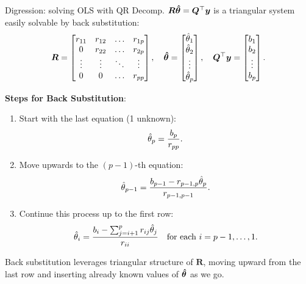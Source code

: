 \documentclass[11pt,compress,t,notes=noshow, xcolor=table]{beamer}
\begin{document}
\begin{vbframe}{Digression: solving OLS with QR Decomp.}
$\bm{R} \bm{\hat{\theta}} = \bm{Q}^{\top} \bm{y}$ is a triangular system easily solvable by back substitution:
\[
\bm{R} = \begin{bmatrix} 
r_{11} & r_{12} & \dots & r_{1p} \\ 
0 & r_{22} & \dots & r_{2p} \\ 
\vdots & \vdots & \ddots & \vdots \\ 
0 & 0 & \dots & r_{pp} 
\end{bmatrix}, \quad 
\bm{\hat{\theta}} = \begin{bmatrix} 
\hat{\theta}_1 \\ 
\hat{\theta}_2 \\ 
\vdots \\ 
\hat{\theta}_p 
\end{bmatrix}, \quad \bm{Q}^{\top} \bm{y} = \begin{bmatrix} 
b_1 \\ 
b_2 \\ 
\vdots \\ 
b_p 
\end{bmatrix}.
\]

\pagebreak

\textbf{Steps for Back Substitution}:
\begin{enumerate}
    \item Start with the last equation (1 unknown):
          \[
          \hat{\theta}_p = \frac{b_p}{r_{pp}}.
          \]
    \item Move upwards to the \( (p-1) \)-th equation:
          \[
          \hat{\theta}_{p-1} = \frac{b_{p-1} - r_{p-1,p} \hat{\theta}_p}{r_{p-1,p-1}}.
          \]
    \item Continue this process up to the first row:
          \[
          \hat{\theta}_i = \frac{b_i - \sum_{j=i+1}^p r_{ij} \hat{\theta}_j}{r_{ii}} \quad \text{for each } i = p-1, \dots, 1.
          \]
\end{enumerate}

Back substitution leverages triangular structure of $\bm{R}$, moving upward from the last row and inserting already known values of $\bm{\hat{\theta}}$ as we go.

\end{vbframe}
\end{document}
